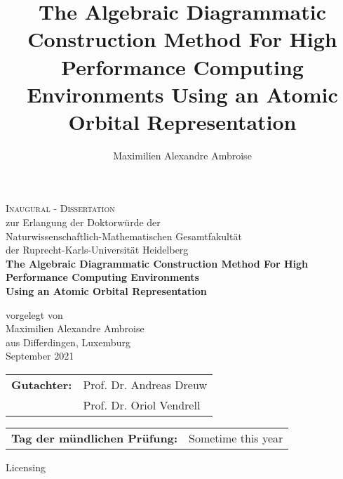 \documentclass[a4paper,12pt]{report}
\begin{document}
\author{Maximilien Alexandre Ambroise}
\title{The Algebraic Diagrammatic Construction Method For High Performance Computing Environments Using an Atomic Orbital Representation}

\begin{titlepage}
\begin{center}
{\Huge\scshape Inaugural - Dissertation \\}
{ zur Erlangung der Doktorwürde der \\
Naturwissenschaftlich-Mathematischen Gesamtfakultät \\
der Ruprecht-Karls-Universität Heidelberg \\}
\vspace{1cm}
{\huge\bfseries The Algebraic Diagrammatic Construction Method For High Performance Computing Environments \\}
{\Large\bfseries Using an Atomic Orbital Representation \\}
 
\vspace{1.5cm}
{vorgelegt von\\}
\vspace*{1.5cm}
{\Large Maximilien Alexandre Ambroise}\\
{\large aus Differdingen, Luxemburg}\\
\vspace{2cm}
{September 2021} \\[5pt]
\vspace{2cm}
\end{center}

\begin{tabular}{ll}
{\bfseries Gutachter:} & Prof. Dr. Andreas Dreuw \\
 & Prof. Dr. Oriol Vendrell
\end{tabular}

\vspace{0.5cm}

\begin{tabular}{ll}
{\bfseries Tag der mündlichen Prüfung:} & {Sometime this year}
\end{tabular}

\end{titlepage}


\newpage

Licensing

\newpage
\end{document}

